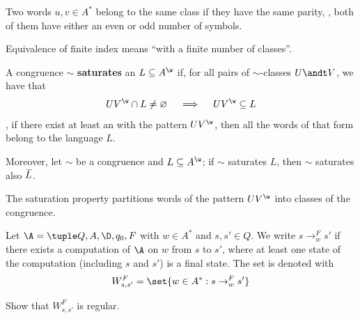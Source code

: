 \documentclass[oneside]{academica}
\begin{document}
\begin{example*}
  Two words $u,v \in A^*$ belong to the same class if they have the same parity, \ie, both of them have either an even or odd number of symbols.
\end{example*}

Equivalence of finite index means ``with a finite number of classes''.

\begin{definition}[Saturation]\label{def:saturation}
  A congruence $\sim$ \textbf{saturates} an \wlan $L \subseteq \Aw$ if, for all pairs of $\sim$-classes $U \andt V$, we have that
  \begin{equation*}
    U V^\w \cap L \neq \emptyset \quad \implies \quad U V^\w \subseteq L
  \end{equation*}
  \ie, if there exist at least an \wword with the pattern $U V^\w$, then all the words of that form belong to the language $L$.

  \bigskip
  Moreover, let $\sim$ be a congruence and $L \subseteq \Aw$; if $\sim$ saturates $L$, then $\sim$ saturates also $\,\overline{\!{L}}$.
\end{definition}


The saturation property partitions words of the pattern $U V^\w$ into classes of the congruence.

\bigskip
Let $\A = \NBA$ with $w \in A^*$ and $s, s' \in Q$.
We write $s \to_w^F s'$ if there exists a computation of $\A$ on $w$ from $s$ to $s'$, where at least one state of the computation (including $s$ and $s'$) is a final state.
The set is denoted with
\begin{equation*}
  W_{s,s'}^F = \set{w \in A^* : s \to_w^F s'}
\end{equation*}

\begin{exercise*}
  Show that $W_{s,s'}^F$ is regular.
\end{exercise*}
\end{document}
